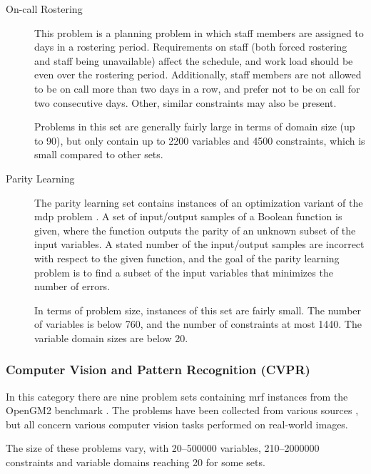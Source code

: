 \begin{description}
	\item[On-call Rostering]
		This problem is a planning problem in which staff members are assigned to days in a rostering period.
		Requirements on staff (both forced rostering and staff being unavailable) affect the schedule, and work load should be even over the rostering period.
		Additionally, staff members are not allowed to be on call more than two days in a row, and prefer not to be on call for two consecutive days.
		Other, similar constraints may also be present.

		Problems in this set are generally fairly large in terms of domain size (up to \num{90}), but only contain up to \num{2200} variables and \num{4500} constraints, which is small compared to other sets.

	\item[Parity Learning]
		The parity learning set contains instances of an optimization variant of the \gls{mdp} problem \parencite{Crawford94}.
		A set of input/output samples of a Boolean function is given, where the function outputs the parity of an unknown subset of the input variables.
		A stated number of the input/output samples are incorrect with respect to the given function, and the goal of the parity learning problem is to find a subset of the input variables that minimizes the number of errors.

		In terms of problem size, instances of this set are fairly small. The number of variables is below \num{760}, and the number of constraints at most \num{1440}. The variable domain sizes are below \num{20}.
\end{description}

\subsubsection{Computer Vision and Pattern Recognition (CVPR)}
In this category there are nine problem sets containing \gls{mrf} instances from the OpenGM2 benchmark \parencite{Kappes13}.
The problems have been collected from various sources \parencite[\pno~1330]{Kappes13}, but all concern various computer vision tasks performed on real-world images.

The size of these problems vary, with \numrange{20}{500000} variables, \numrange{210}{2000000} constraints and variable domains reaching \num{20} for some sets.

